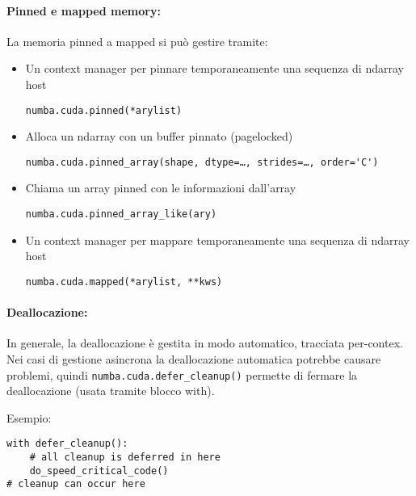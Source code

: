 \paragraph{Pinned e mapped memory:} La memoria pinned a mapped si può gestire tramite:
\begin{itemize}
	\item Un context manager per pinnare temporaneamente una sequenza di ndarray host
	\begin{verbatim}
numba.cuda.pinned(*arylist)
	\end{verbatim}
	
	\item Alloca un ndarray con un buffer pinnato (pagelocked)
	\begin{verbatim}
numba.cuda.pinned_array(shape, dtype=…, strides=…, order='C')
	\end{verbatim}
	
	\item Chiama un array pinned con le informazioni dall'array 
	\begin{verbatim}
numba.cuda.pinned_array_like(ary)
	\end{verbatim}
	
	\item Un context manager  per mappare temporaneamente una sequenza di ndarray host
	\begin{verbatim}
numba.cuda.mapped(*arylist, **kws)
	\end{verbatim}
\end{itemize}

\paragraph{Deallocazione:} In generale, la deallocazione è gestita in modo automatico, tracciata per-contex. Nei casi di gestione asincrona la deallocazione automatica potrebbe causare problemi, quindi \texttt{numba.cuda.defer\_cleanup()} permette di fermare la deallocazione (usata tramite blocco with). 

Esempio:
\begin{verbatim}
with defer_cleanup():
	# all cleanup is deferred in here
	do_speed_critical_code()
# cleanup can occur here
\end{verbatim}

